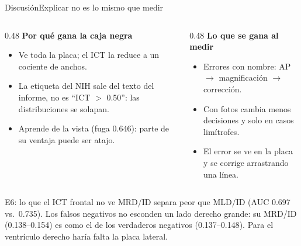 \documentclass[aspectratio=169,10pt]{beamer}
\newcommand{\M}[1]{{\color{medir}\bfseries #1}}
\newcommand{\C}[1]{{\color{clasif}\bfseries #1}}
\begin{document}
\begin{frame}{Discusión}{Explicar no es lo mismo que medir}
\begin{columns}[T]
\begin{column}{0.48\textwidth}
\C{Por qué gana la caja negra}
\begin{itemize}\small
\item Ve toda la placa; el ICT la reduce a un cociente de anchos.
\item La etiqueta del NIH sale del texto del informe, no es ``ICT $>$ 0.50'': las distribuciones se solapan.
\item Aprende de la vista (fuga 0.646): parte de su ventaja puede ser atajo.
\end{itemize}
\end{column}
\begin{column}{0.48\textwidth}
\M{Lo que se gana al medir}
\begin{itemize}\small
\item Errores con nombre: AP $\to$ magnificación $\to$ corrección.
\item Con fotos cambia menos decisiones y solo en casos limítrofes.
\item El error se ve en la placa y se corrige arrastrando una línea.
\end{itemize}
\end{column}
\end{columns}
\vspace{0.6em}
\begin{block}{E6: lo que el ICT frontal no ve}\small
MRD/ID separa peor que MLD/ID (AUC 0.697 vs.\ 0.735). Los falsos negativos no esconden un lado derecho grande: su
MRD/ID (0.138--0.154) es como el de los verdaderos negativos (0.137--0.148). Para el ventrículo derecho haría falta
la placa lateral.
\end{block}
\end{frame}
\end{document}
